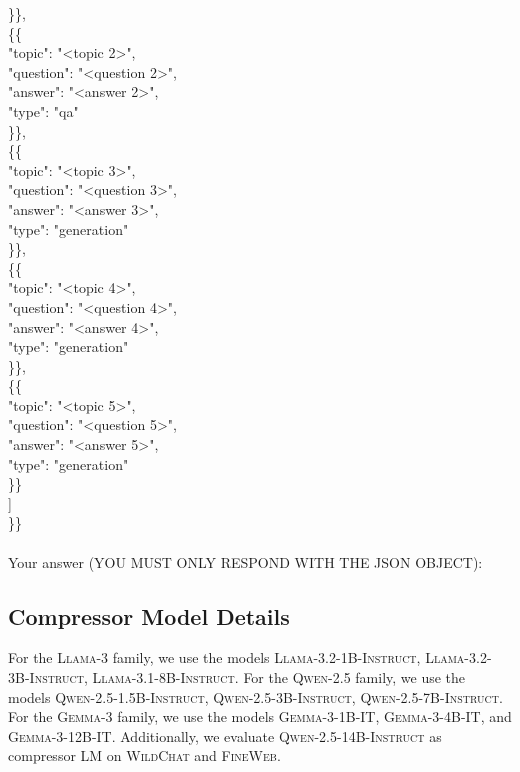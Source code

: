 \documentclass{article} %
\newcommand{\tab}{\hspace*{2em}}
\begin{document}
\begin{examplebox}
\tab \tab \}\}, \\
\tab \tab \{\{ \\
\tab \tab \tab"topic": "<topic 2>", \\
\tab \tab \tab"question": "<question 2>", \\
\tab \tab \tab"answer": "<answer 2>", \\
\tab \tab \tab"type": "qa" \\
\tab \tab \}\}, \\
\tab \tab \{\{ \\
\tab \tab \tab"topic": "<topic 3>", \\
\tab \tab \tab"question": "<question 3>", \\
\tab \tab \tab"answer": "<answer 3>", \\
\tab \tab \tab"type": "generation" \\
\tab \tab \}\}, \\
\tab \tab \{\{ \\
\tab \tab \tab "topic": "<topic 4>", \\
\tab \tab \tab "question": "<question 4>", \\
\tab \tab \tab "answer": "<answer 4>", \\
\tab \tab \tab "type": "generation" \\
\tab \tab \}\}, \\
\tab \tab \{\{ \\
\tab \tab \tab "topic": "<topic 5>", \\
\tab \tab \tab "question": "<question 5>", \\
\tab \tab \tab "answer": "<answer 5>", \\
\tab \tab \tab "type": "generation" \\
\tab \tab \}\} \\
\tab ] \\
\}\}
\\\\
Your answer (YOU MUST ONLY RESPOND WITH THE JSON OBJECT):
\end{examplebox}



\subsection{Compressor Model Details}
\label{sec:appendix-compressor-model}

For the \textsc{Llama-3} family, we use the models \textsc{Llama-3.2-1B-Instruct}, \textsc{Llama-3.2-3B-Instruct}, \textsc{Llama-3.1-8B-Instruct}. For the \textsc{Qwen-2.5} family, we use the models \textsc{Qwen-2.5-1.5B-Instruct}, \textsc{Qwen-2.5-3B-Instruct}, \textsc{Qwen-2.5-7B-Instruct}. For the \textsc{Gemma-3} family, we use the models \textsc{Gemma-3-1B-IT}, \textsc{Gemma-3-4B-IT}, and \textsc{Gemma-3-12B-IT}. Additionally, we evaluate \textsc{Qwen-2.5-14B-Instruct} as compressor LM on \textsc{WildChat} and \textsc{FineWeb}. 
\end{document}
